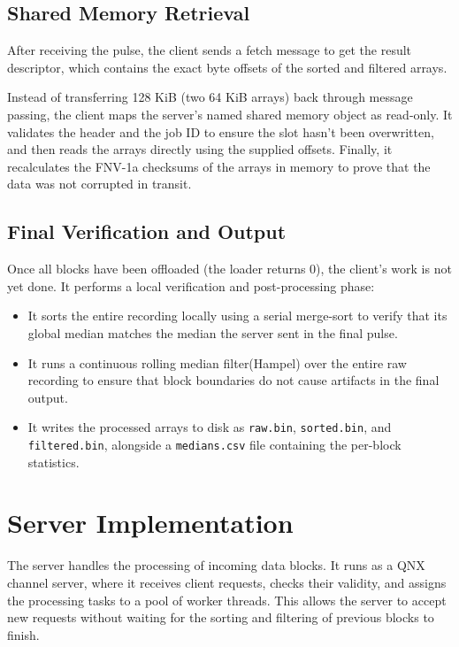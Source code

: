 \documentclass[12pt,a4paper,oneside]{report}
\begin{document}
\subsection{Shared Memory Retrieval}
After receiving the pulse, the client sends a fetch message to get the result descriptor, which contains the exact byte offsets of the sorted and filtered arrays. 

Instead of transferring 128 KiB (two 64 KiB arrays) back through message passing, the client maps the server's named shared memory object as read-only. It validates the header and the job ID to ensure the slot hasn't been overwritten, and then reads the arrays directly using the supplied offsets. Finally, it recalculates the FNV-1a checksums of the arrays in memory to prove that the data was not corrupted in transit.

\subsection{Final Verification and Output}
Once all blocks have been offloaded (the loader returns 0), the client's work is not yet done. It performs a local verification and post-processing phase:
\begin{itemize}
    \item It sorts the entire recording locally using a serial merge-sort to verify that its global median matches the median the server sent in the final pulse.
    \item It runs a continuous rolling median filter(Hampel) over the entire raw recording to ensure that block boundaries do not cause artifacts in the final output.
    \item It writes the processed arrays to disk as \texttt{raw.bin}, \texttt{sorted.bin}, and \texttt{filtered.bin}, alongside a \texttt{medians.csv} file containing the per-block statistics.
\end{itemize}

\section{Server Implementation}
\label{sec:server}

The server handles the processing of incoming data blocks. It runs as a QNX channel server, where it receives client requests, checks their validity, and assigns the processing tasks to a pool of worker threads. This allows the server to accept new requests without waiting for the sorting and filtering of previous blocks to finish.
\end{document}
